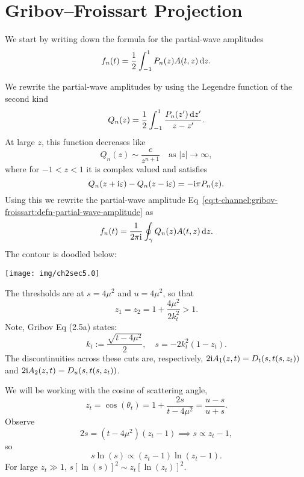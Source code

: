 \section{Gribov--Froissart Projection}

\M
We start by writing down the formula for the partial-wave amplitudes
\begin{equation}\label{eq:t-channel:gribov-froissart:defn-partial-wave-amplitude}
f_{n}(t) = \frac{1}{2}\int^{1}_{-1}P_{n}(z)A(t,z)\,\mathrm{d} z.
\end{equation}

\M
We rewrite the partial-wave amplitudes by using the Legendre function of
the second kind
\begin{equation}
Q_{n}(z) = \frac{1}{2}\int^{1}_{-1}\frac{P_{n}(z')\,\mathrm{d} z'}{z-z'}.
\end{equation}
At large $z$, this function decreases like
\begin{equation}
Q_{n}(z)\sim\frac{c}{z^{n+1}}\quad\mbox{as }|z|\to\infty,
\end{equation}
where for $-1<z<1$ it is complex valued and satisfies
\begin{equation}
Q_{n}(z+\mathrm{i}\varepsilon)-Q_{n}(z-\mathrm{i}\varepsilon)=-\mathrm{i}\pi P_{n}(z).
\end{equation}
Using this we rewrite the partial-wave amplitude Eq~\eqref{eq:t-channel:gribov-froissart:defn-partial-wave-amplitude}
as
\begin{equation}
f_{n}(t) = \frac{1}{2\pi\mathrm{i}}\oint_{\gamma} Q_{n}(z)A(t,z)\,\mathrm{d} z.
\end{equation}
The contour is doodled below:
\begin{center}
  \texttt{[image: img/ch2sec5.0]}
\end{center}

\M
The thresholds are at $s=4\mu^{2}$ and $u=4\mu^{2}$, so that
\begin{equation}
z_{1} = z_{2} = 1 + \frac{4\mu^{2}}{2k_{t}^{2}} > 1.
\end{equation}
Note, Gribov Eq (2.5a) states:
\begin{equation}
k_{t} := \frac{\sqrt{t - 4\mu^{2}}}{2},\quad s = -2k_{t}^{2}(1 - z_{t}).
\end{equation}
The discontinuities across these cuts are, respectively, $2\mathrm{i}A_{1}(z,t)=D_{t}(s,t(s,z_{t}))$
and $2\mathrm{i}A_{2}(z,t) = D_{u}(s,t(s,z_{t}))$.

We will be working with the cosine of scattering angle,
\begin{equation}
z_{t} = \cos(\theta_{t}) = 1 + \frac{2s}{t - 4\mu^{2}} = \frac{u-s}{u+s}.
\end{equation}
Observe
\begin{equation}
2s = (t - 4\mu^{2})(z_{t}-1)\implies s\propto z_{t}-1,
\end{equation}
so
\begin{equation}
s\ln(s) \propto (z_{t}-1)\ln(z_{t}-1).
\end{equation}
For large $z_{t}\gg1$, $s[\ln(s)]^{2}\sim z_{t}[\ln(z_{t})]^{2}$.

